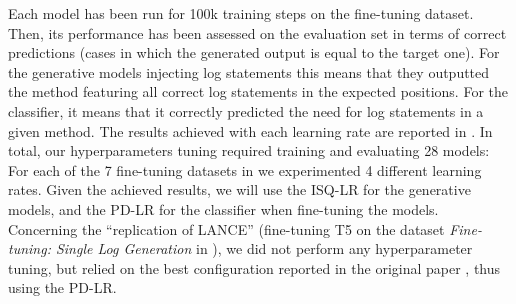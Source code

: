 
Each model has been run for 100k training steps on the fine-tuning dataset. Then, its performance has been assessed on the evaluation set in terms of correct predictions (\ie cases in which the generated output is equal to the target one). For the generative models injecting log statements this means that they outputted the \java method featuring all correct log statements in the expected positions. For the classifier, it means that it correctly predicted the need for log statements in a given \java method. The results achieved with each learning rate are reported in . In total, our hyperparameters tuning required training and evaluating 28 models: For each of the 7 fine-tuning datasets in  we experimented 4 different learning rates. Given the achieved results, we will use the ISQ-LR for the generative models, and the PD-LR for the classifier when fine-tuning the models. Concerning the ``replication of LANCE'' (\ie fine-tuning T5 on the dataset \emph{Fine-tuning: Single Log Generation} in ), we did not perform any hyperparameter tuning, but relied on the best configuration reported in the original paper \cite{mastropaolo2021studying}, thus using the PD-LR.

